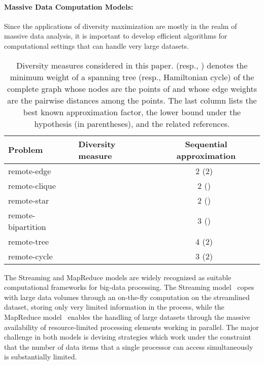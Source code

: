 \documentclass{article}
\begin{document}
\paragraph{Massive Data Computation Models:}
Since the applications of diversity maximization are
mostly in the realm of massive data analysis, it is important to
develop efficient algorithms for computational settings that can
handle very large datasets.  
\newcommand{\definitionTableVerticalSpacing}{\rule{0pt}{10pt}}
\begin{table}[t]
  \centering
  \begin{tabular}{llc}\toprule
    Problem
     & Diversity measure
     & Sequential approximation
    \\
    \midrule
    remote-edge
      & 
      & 2 (2)~\cite{Tamir91} 
    \\
    \definitionTableVerticalSpacing remote-clique
      &  
      & 2 ()~\cite{HassinRT97} 
    \\
    \definitionTableVerticalSpacing remote-star 
      &  
      & 2 ()~\cite{ChandraH01} 
    \\
    \definitionTableVerticalSpacing remote-bipartition
      & 
& 3 ()~\cite{ChandraH01} 
    \\
    \definitionTableVerticalSpacing remote-tree 
      &  
      & 4 (2)~\cite{HalldorssonIKT99} 
    \\
    \definitionTableVerticalSpacing remote-cycle 
      & 
      & 3 (2)~\cite{HalldorssonIKT99} 
    \\
    \bottomrule
  \end{tabular}
  \caption{Diversity measures considered in this paper.   (resp.,
    ) denotes the minimum weight of a spanning tree (resp.,
    Hamiltonian cycle) of the complete graph whose nodes are the points of
     and whose edge weights are the pairwise distances among the
    points.  The last column lists the best known approximation factor,
    the lower bound under the hypothesis  (in parentheses), and
    the related references. 
  }\label{tab:diversity-notions}
\end{table}
The Streaming and MapReduce models are widely recognized as suitable
computational frameworks for big-data processing.  The Streaming
model~\cite{RaghavanH99} copes with large data volumes through an
on-the-fly computation on the streamlined dataset, storing only very
limited information in the process, while the MapReduce
model~\cite{KarloffSV10,PietracaprinaPRSU12} enables the handling of
large datasets through the massive availability of resource-limited
processing elements working in parallel. The major challenge in
both models is devising strategies which work under the constraint
that the number of data items that a single processor can access
simultaneously is substantially limited.
\end{document}
